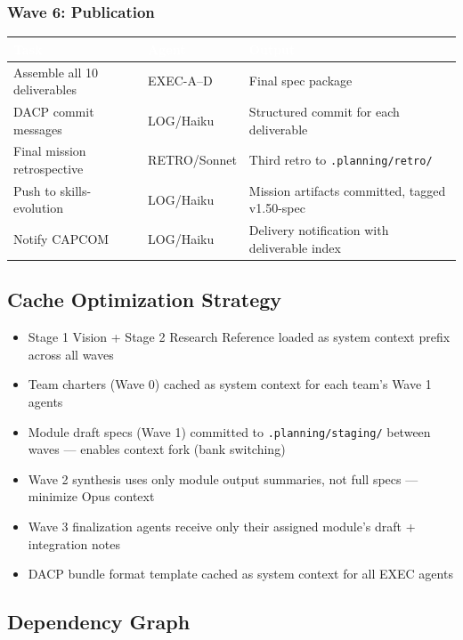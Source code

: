 \documentclass[11pt,letterpaper]{article}
\newcommand{\tableheader}[1]{\textbf{\sffamily\textcolor{white}{#1}}}
\begin{document}
\subsubsection{Wave 6: Publication}

\begin{center}
\begin{tabularx}{\textwidth}{L{4cm}L{2cm}X}
\toprule
{}
\tableheader{Task} & \tableheader{Agent} & \tableheader{Output} \\
\midrule
Assemble all 10 deliverables & EXEC-A--D & Final spec package \\
DACP commit messages & LOG/Haiku & Structured commit for each deliverable \\
Final mission retrospective & RETRO/Sonnet & Third retro to \texttt{.planning/retro/} \\
Push to skills-evolution & LOG/Haiku & Mission artifacts committed, tagged v1.50-spec \\
Notify CAPCOM & LOG/Haiku & Delivery notification with deliverable index \\
\end{tabularx}
\end{center}

\subsection{Cache Optimization Strategy}

\begin{itemize}[noitemsep]
  \item Stage 1 Vision + Stage 2 Research Reference loaded as system context prefix across all waves
  \item Team charters (Wave 0) cached as system context for each team's Wave 1 agents
  \item Module draft specs (Wave 1) committed to \texttt{.planning/staging/} between waves --- enables context fork (bank switching)
  \item Wave 2 synthesis uses only module output summaries, not full specs --- minimize Opus context
  \item Wave 3 finalization agents receive only their assigned module's draft + integration notes
  \item DACP bundle format template cached as system context for all EXEC agents
\end{itemize}

\subsection{Dependency Graph}
\end{document}
